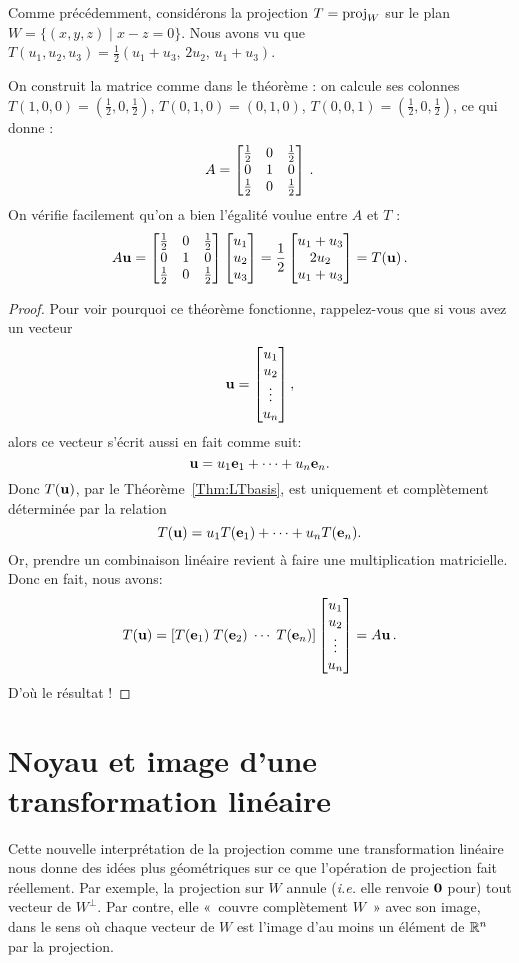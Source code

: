 \begin{myexample}
Comme précédemment, considérons la projection $T = \operatorname{proj}_W$ sur le plan $W = \{(x,y,z)\mid x-z=0\}$. Nous avons vu que $T(u_1, u_2,u_3) = \frac12(u_1+u_3,\,2u_2,\,u_1+u_3)$.

On construit la matrice comme dans le théorème : on calcule ses colonnes  $T(1,0,0) = (\frac12,0,\frac12)$, $T(0,1,0) = (0,1,0)$, $T(0,0,1) = (\frac12,0,\frac12)$, ce qui donne :
$$
A = \left[ \begin{matrix} \frac12 & 0 & \frac12\\ 0 & 1 & 0\\ \frac12 & 0 & \frac12 \end{matrix} \right]\,.
$$
On vérifie facilement qu'on a bien l'égalité voulue entre $A$ et $T$ :
$$
A\mathbf{u} =  \left[ \begin{matrix} \frac12 & 0 & \frac12\\ 0 & 1 & 0\\ \frac12 & 0 & \frac12 \end{matrix} \right]\left[ \begin{matrix} u_1\\u_2\\u_3 \end{matrix} \right] = \frac12\left[ \begin{matrix} u_1+u_3\\2u_2\\u_1+u_3 \end{matrix} \right] = T(\mathbf{u})\,.
$$
\end{myexample}

\begin{proof}
Pour voir pourquoi ce théorème fonctionne, rappelez-vous que si vous avez un vecteur
$$\mathbf{u} = \left[ \begin{matrix} u_1 \\ u_2 \\ \vdots \\ u_n \end{matrix} \right],
$$
alors ce vecteur s'écrit aussi en fait comme suit:  
$$
\mathbf{u} = u_1\mathbf{e}_1 + \cdots + u_n\mathbf{e}_n.
$$
Donc $T(\mathbf{u})$, par le Th\'eor\`eme~\ref{Thm:LTbasis}, 
est uniquement et complètement déterminée par la relation
$$
T(\mathbf{u}) = u_1 T(\mathbf{e}_1) + \cdots + u_nT(\mathbf{e}_n).
$$
Or, prendre un combinaison linéaire revient à faire une multiplication matricielle. Donc en fait, nous avons:
$$
T(\mathbf{u}) = \left[ T(\mathbf{e}_1) \;  T(\mathbf{e}_2)\; \cdots \;   T(\mathbf{e}_n)\right]
\left[ \begin{matrix} u_1 \\ u_2 \\ \vdots \\ u_n \end{matrix} \right] = A\mathbf{u}\,.
$$
D'où le résultat !
\end{proof}


\section{Noyau et image d'une transformation linéaire}

Cette nouvelle interprétation de la projection comme une transformation linéaire
nous donne des idées plus géométriques sur ce que l'opération de projection
fait réellement.  Par exemple, la projection sur $W$ annule (\textit{i.e.} elle renvoie
$\mathbf{0}$ pour) tout vecteur de $W^\perp$.  Par contre, elle «~couvre complètement $W$~»
avec son image, dans le sens où chaque vecteur de $W$ est l'image d'au moins un élément de $\mathbb{R}^n$ par la projection.

